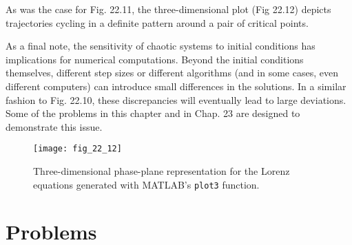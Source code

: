 \noindent As was the case for Fig. 22.11, the three-dimensional plot (Fig 22.12) depicts trajectories
cycling in a definite pattern around a pair of critical points.

As a final note, the sensitivity of chaotic systems to initial conditions has implications
for numerical computations. Beyond the initial conditions themselves, different step sizes
or different algorithms (and in some cases, even different computers) can introduce small
differences in the solutions. In a similar fashion to Fig. 22.10, these discrepancies will
eventually lead to large deviations. Some of the problems in this chapter and in Chap. 23
are designed to demonstrate this issue.

\begin{figure}[H]
    \centering
    \texttt{[image: fig\_22\_12]}
   \caption{\textsf{Three-dimensional phase-plane representation for the Lorenz equations generated with MATLAB's \texttt{plot3} function.}}\label{fig:fig_22_12}
\end{figure}\vspace{2cm}


\section{Problems}

